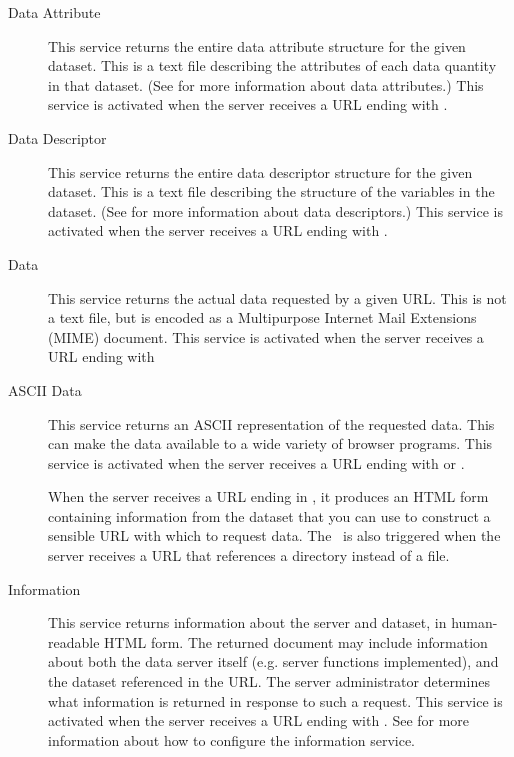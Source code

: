%
%
\begin{description}
  
\item[Data Attribute] This service returns the entire data
  attribute structure for the given dataset. This is a text file
  describing the attributes of each data quantity in that dataset.
  (See  for more information about data
  attributes.)  This service is activated when the
  server receives a URL ending with .
  
\item[Data Descriptor] This service returns the entire data descriptor
  structure for the given dataset. This is a text file describing the
  structure of the variables in the dataset. (See
   for more information about data descriptors.)
  This service is activated when the server receives a URL ending with
  .
  
\item[\opendap Data] This service returns the actual data requested by
  a given URL. This is not a text file, but is encoded as a
  Multipurpose Internet Mail Extensions (MIME) document.  This service
  is activated when the server receives a URL ending with 
  
\item[ASCII Data] This service returns an ASCII representation of
  the requested data.  This can make the data available to a wide
  variety of browser programs.  This service is activated when the
  server receives a URL ending with  or .  

\item[\ifh] When the server receives a URL ending in
  , it produces an HTML form containing information from
  the dataset that you can use to construct a sensible URL with which
  to request \opendap data.  The \ifh\ is also triggered when the \opendap
  server receives a URL that references a directory instead of a file.

\item[Information]  This service returns information about
  the server and dataset, in human-readable HTML form.  The returned
  document may include information about both the data server itself
  (e.g. server functions implemented), and the dataset referenced in
  the URL.  The server administrator determines what information is
  returned in response to such a request.  This service is activated
  when the server receives a URL ending with . See
   for more information about how to
  configure the information service.


\end{description}
